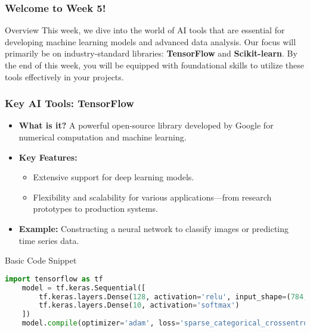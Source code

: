 \documentclass[aspectratio=169]{beamer}
\begin{document}
\frame{\titlepage}

\begin{frame}
    \titlepage
\end{frame}

\begin{frame}[fragile]
    \frametitle{Welcome to Week 5!}
    \begin{block}{Overview}
        This week, we dive into the world of AI tools that are essential for developing machine learning models and advanced data analysis. 
        Our focus will primarily be on industry-standard libraries: \textbf{TensorFlow} and \textbf{Scikit-learn}. 
        By the end of this week, you will be equipped with foundational skills to utilize these tools effectively in your projects.
    \end{block}
\end{frame}

\begin{frame}[fragile]
    \frametitle{Key AI Tools: TensorFlow}
    \begin{itemize}
        \item \textbf{What is it?} A powerful open-source library developed by Google for numerical computation and machine learning.
        \item \textbf{Key Features:}
        \begin{itemize}
            \item Extensive support for deep learning models.
            \item Flexibility and scalability for various applications—from research prototypes to production systems.
        \end{itemize}
        \item \textbf{Example:} Constructing a neural network to classify images or predicting time series data.
    \end{itemize}
    \begin{block}{Basic Code Snippet}
    \begin{lstlisting}[language=Python]
    import tensorflow as tf
    model = tf.keras.Sequential([
        tf.keras.layers.Dense(128, activation='relu', input_shape=(784,)),
        tf.keras.layers.Dense(10, activation='softmax')
    ])
    model.compile(optimizer='adam', loss='sparse_categorical_crossentropy', metrics=['accuracy'])
    \end{lstlisting}
    \end{block}
\end{frame}
\end{document}
